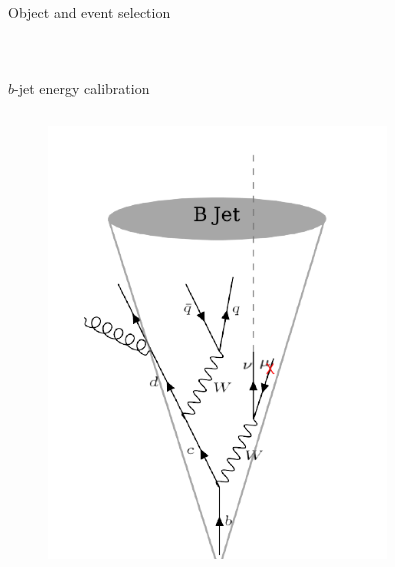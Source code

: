 \begin{frame}{Object and event selection}
\begin{columns}
\begin{figure}
\end{figure}


\end{columns}

\end{frame}

\begin{frame}{$b$-jet energy calibration}
\begin{columns}
\begin{figure}
    \centering
    \includegraphics[width=0.8\textwidth]{Part3/Img/b-jet-nobkg.png}
\end{figure}



\end{columns}
\end{frame}

